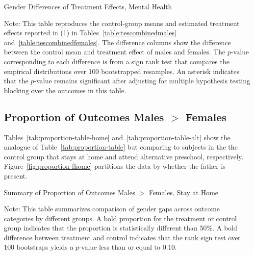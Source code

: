 \begin{table}[!htbp]
\centering
\begin{threeparttable}
\caption{Gender Differences of Treatment Effects, Mental Health}
\begin{scriptsize}

\end{scriptsize}
\begin{tablenotes}
\scriptsize
Note: This table reproduces the control-group means and estimated treatment effects reported in (1) in Tables~\ref{table:tescombinedmales} and~\ref{table:tescombinedfemales}. The difference columns show the difference between the control mean and treatment effect of males and females. The $p$-value corresponding to each difference is from a sign rank test that compares the empirical distributions over 100 bootstrapped resamples. An asterisk indicates that the $p$-value remains significant after adjusting for multiple hypothesis testing blocking over the outcomes in this table.
\end{tablenotes}
\end{threeparttable}
\end{table}

\subsection{Proportion of Outcomes Males $>$ Females}
\label{appendix:propmales-females}

Tables~\ref{tab:proportion-table-home} and~\ref{tab:proportion-table-alt} show the analogue of Table~\ref{tab:proportion-table} but comparing to subjects in the the control group that stays at home and attend alternative preschool, respectively. Figure~\ref{fig:proportion-fhome} partitions the data by whether the father is present.


\begin{table}[H]
\centering
\caption{Summary of Proportion of Outcomes Males $>$ Females, Stay at Home}
\label{tab:proportion-table-home}
\begin{threeparttable}

\begin{tablenotes}
\footnotesize
\item Note: This table summarizes comparison of gender gaps across outcome categories by different groups. A bold proportion for the treatment or control group indicates that the proportion is statistically different than 50\%. A bold difference between treatment and control indicates that the rank sign test over 100 bootstraps yields a $p$-value less than or equal to 0.10. 
\end{tablenotes}
\end{threeparttable}
\end{table}

